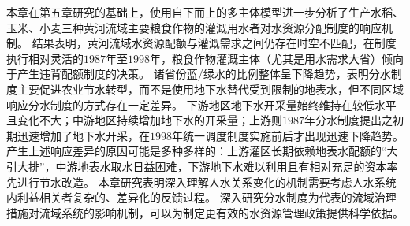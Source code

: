 本章在第五章研究的基础上，使用自下而上的多主体模型进一步分析了生产水稻、玉米、小麦三种黄河流域主要粮食作物的灌溉用水者对水资源分配制度的响应机制。
结果表明，黄河流域水资源配额与灌溉需求之间仍存在时空不匹配，在制度执行相对灵活的$1987$年至$1998$年，粮食作物灌溉主体（尤其是用水需求大省）倾向于产生违背配额制度的决策。
诸省份蓝/绿水的比例整体呈下降趋势，表明分水制度主要促进农业节水转型，而不是使用地下水替代受到限制的地表水，但不同区域响应分水制度的方式存在一定差异。
下游地区地下水开采量始终维持在较低水平且变化不大；中游地区持续增加地下水的开采量；上游则$1987$年分水制度提出之初期迅速增加了地下水开采，在$1998$年统一调度制度实施前后才出现迅速下降趋势。
产生上述响应差异的原因可能是多种多样的：上游灌区长期依赖地表水配额的“大引大排”，中游地表水取水日益困难，下游地下水难以利用且有相对充足的资本率先进行节水改造。
本章研究表明深入理解人水关系变化的机制需要考虑人水系统内利益相关者复杂的、差异化的反馈过程。
深入研究分水制度为代表的流域治理措施对流域系统的影响机制，可以为制定更有效的水资源管理政策提供科学依据。
